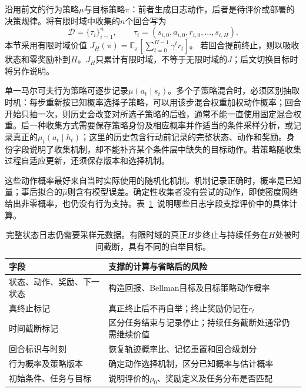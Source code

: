 \begin{definition}[行为策略与目标策略]
  \label{def:rl-information-behavior}
  沿用前文的行为策略$\mu$与目标策略$\pi$：前者生成日志动作，后者是待评价或部署的决策规律。将有限时域中收集的$n$个回合写为
  \[
    \mathcal D=\{\tau_i\}_{i=1}^n,\qquad
    \tau_i=(s_{i,0},a_{i,0},r_{i,0},\ldots,s_{i,H}).
  \]
  本节采用有限时域价值
  $J_H(\pi)=\mathbb E_\pi[\sum_{t=0}^{H-1}\gamma^t r_t]$。
  若回合提前终止，则以吸收状态和零奖励补到$H$。$J_H$只累计有限时域，不等于无限时域的$J$；后文切换目标时将另作说明。
\end{definition}

单一马尔可夫行为策略可逐步记录$\mu(a_t\mid s_t)$。多个子策略混合时，必须区别抽取时机：每步重新按已知概率选择子策略，可以用该步混合权重加权动作概率；回合开始只抽一次，则历史会改变对所选子策略的后验，通常不能一直使用固定混合权重。后一种收集方式需要保存策略身份及相应概率并作适当的条件采样分析，或记录真正的$\mu_t(a_t\mid h_t)$；这里的历史包含行动前记录的完整状态、动作和奖励。身份字段说明了收集机制，却不能补齐某个条件层中缺失的目标动作。若策略随收集过程自适应更新，还须保存版本和选择机制。

这些动作概率最好来自当时实际使用的随机化机制。机制记录正确时，概率是已知量；事后拟合的$\widehat\mu$则含有模型误差。确定性收集者没有尝试的动作，即使密度网络给出非零概率，也仍没有行为支持。表~\ref{tab:rl-information-fields}~说明哪些日志字段支撑评价中的具体计算。

\begin{table}[htbp]
  \centering
  \small
  \begin{tabularx}{\linewidth}{p{29mm}X}
    \toprule
    字段 & 支撑的计算与省略后的风险 \\
    \midrule
    状态、动作、奖励、下一状态 & 构造回报、Bellman目标及目标策略动作概率 \\
    真终止标记 & 真正终止后不再自举；终止奖励仍记在$r_t$ \\
    时间截断标记 & 区分任务结束与记录停止；持续任务截断处通常仍需继续价值 \\
    回合标识与时刻 & 恢复轨迹概率比、记忆重置和回合级划分 \\
    行为概率及策略版本 & 确定动作选择机制，区分已知概率与估计概率 \\
    初始条件、任务与目标 & 说明评价的$\rho_0$、奖励定义及任务分布是否匹配 \\
    \bottomrule
  \end{tabularx}
  \caption{完整状态日志仍需要采样元数据。有限时域的真正$H$步终止与持续任务在$H$处被时间截断，具有不同的自举目标。}
  \label{tab:rl-information-fields}
\end{table}

